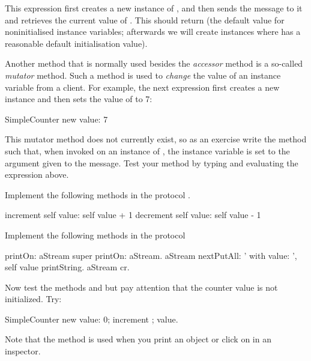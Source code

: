 


This expression first creates a new instance of
, and then sends the message  to it
and retrieves the current value of . This should return
 (the default value for noninitialised instance variables;
afterwards we will create instances where  has a
reasonable default initialisation value).


\exercise  Another method that is normally used besides the
\textit{accessor} method is a so-called \textit{mutator} method.
Such a method is used to \emph{change} the value of an instance variable
from a client. For example, the next expression first creates a
new  instance and then sets the value of
 to 7:
\begin{scode}
SimpleCounter new value: 7
\end{scode}


This mutator method does not currently exist, so as an exercise
write the method  such that, when invoked on
an instance of , the 
instance variable is set to the argument given to the message.
Test your method by typing and evaluating the expression above.

\exercise Implement the following methods in the protocol
.

\begin{scode}
increment
    self value: self value + 1
decrement
    self value: self value - 1
\end{scode}

\exercise Implement the following methods in the protocol
\begin{scode}
printOn: aStream
    super printOn: aStream.
    aStream nextPutAll: ' with value: ',
    self  value printString.
    aStream cr.
\end{scode}

Now test the methods  and  but pay
attention that the counter value is not initialized. Try:
\begin{scode}
SimpleCounter new value: 0; increment ; value.
\end{scode}
Note that the method  is used when you print an
object or click on  in an inspector.

